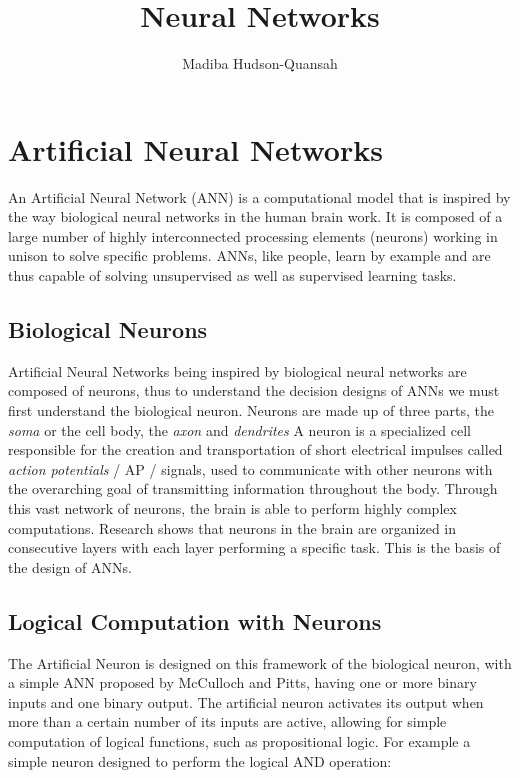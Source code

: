 \documentclass[12pt letter]{report}
\title{\Huge{Neural Networks}}
\date{}
\author{\huge{Madiba Hudson-Quansah}}
\begin{document}
    
\newpage
{}
    
    \maketitle
    
    
    \tableofcontents
\newpage


    
\chapter{Artificial Neural Networks}\label{artificial-neural-networks}

An Artificial Neural Network (ANN) is a computational model that is
inspired by the way biological neural networks in the human brain work.
It is composed of a large number of highly interconnected processing
elements (neurons) working in unison to solve specific problems. ANNs,
like people, learn by example and are thus capable of solving
unsupervised as well as supervised learning tasks.

\section{Biological Neurons}\label{biological-neurons}

Artificial Neural Networks being inspired by biological neural networks
are composed of neurons, thus to understand the decision designs of ANNs
we must first understand the biological neuron. Neurons are made up of
three parts, the \emph{soma} or the cell body, the \emph{axon} and
\emph{dendrites} A neuron is a specialized cell responsible for the
creation and transportation of short electrical impulses called
\emph{action potentials} / AP / signals, used to communicate with other
neurons with the overarching goal of transmitting information throughout
the body. Through this vast network of neurons, the brain is able to
perform highly complex computations. Research shows that neurons in the
brain are organized in consecutive layers with each layer performing a
specific task. This is the basis of the design of ANNs.

\section{Logical Computation with
Neurons}\label{logical-computation-with-neurons}

The Artificial Neuron is designed on this framework of the biological
neuron, with a simple ANN proposed by McCulloch and Pitts, having one or
more binary inputs and one binary output. The artificial neuron
activates its output when more than a certain number of its inputs are
active, allowing for simple computation of logical functions, such as
propositional logic. For example a simple neuron designed to perform the
logical AND operation:
\end{document}

